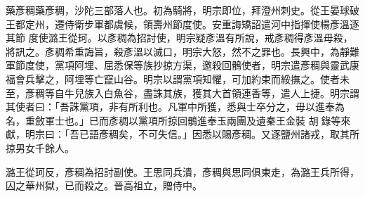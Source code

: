 \begin{pinyinscope}
 藥彥稠藥彥稠，沙陀三部落人也。初為騎將，明宗即位，拜澄州刺史。從王晏球破王都定州，遷侍衛步軍都虞候，領壽州節度使。安重誨矯詔遣河中指揮使楊彥溫逐其節
 度使潞王從珂。以彥稠為招討使，明宗疑彥溫有所說，戒彥稠得彥溫毋殺，將訊之。彥稠希重誨旨，殺彥溫以滅口，明宗大怒，然不之罪也。長興中，為靜難軍節度使，黨項阿埋、屈悉保等族抄掠方渠，邀殺回鶻使者，明宗遣彥稠與靈武康福會兵擊之，阿埋等亡竄山谷。明宗以謂黨項知懼，可加約束而綏撫之。使者未至，彥稠等自牛兒族入白魚谷，盡誅其族，獲其大首領連香等，遣人上捷。明宗謂其使者曰：「吾誅黨項，非有所利也。凡軍中所獲，悉與士卒分之，毋以進奉為名，重斂軍士也。」已而彥稠以黨項所掠回鶻進奉玉兩團及遺秦王金裝
 胡錄等來獻，明宗曰：「吾已語彥稠矣，不可失信。」因悉以賜彥稠。又逐鹽州諸戎，取其所掠男女千餘人。



 潞王從珂反，彥稠為招討副使。王思同兵潰，彥稠與思同俱東走，為潞王兵所得，囚之華州獄，已而殺之。晉高祖立，贈侍中。



\end{pinyinscope}